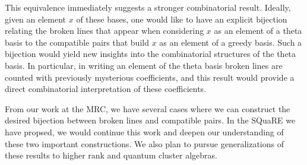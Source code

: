\documentclass{amsart}
\begin{document}
    This equivalence immediately suggests a stronger combinatorial result. Ideally, 
    given an element $x$ of these bases, one would like to have an explicit bijection relating the 
    broken lines that appear when considering $x$ as an element of a theta basis
    to the compatible pairs that build $x$ as an element of a greedy basis. Such a bijection 
    would yield new insights into the combinatorial structures
    of the theta basis. In particular, in writing an element of the theta basis broken lines are counted with previously 
    mysterious coefficients, and this result would provide a direct combinatorial interpretation of these coefficients.
    
    From our work at the MRC, we have several 
    cases where we can construct the desired bijection between broken lines and compatible 
    pairs.   In the SQuaRE we have propsed, we would continue this work and deepen our understanding of these two important
    constructions.  We also plan to pursue generalizations of these results to higher rank 
    and quantum cluster algebras.
\end{document}
